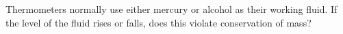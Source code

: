         Thermometers normally use either mercury or alcohol as their working fluid.
        If the level of the fluid rises or falls, does this violate conservation of mass?
